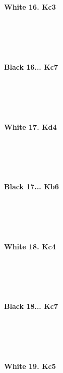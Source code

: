 \documentclass{article}
\begin{document}

\\
\\

\\
\\
\textbf{White 16. Kc3}\\
\\
\\
\\

\\
\\
\textbf{Black 16... Kc7}\\
\\
\\
\\

\\
\\
\textbf{White 17. Kd4}\\
\\
\\
\\

\\
\\
\textbf{Black 17... Kb6}\\
\\
\\
\\

\\
\\
\textbf{White 18. Kc4}\\
\\
\\
\\

\\
\\
\textbf{Black 18... Kc7}\\
\\
\\
\\

\\
\\
\textbf{White 19. Kc5}\\
\end{document}

